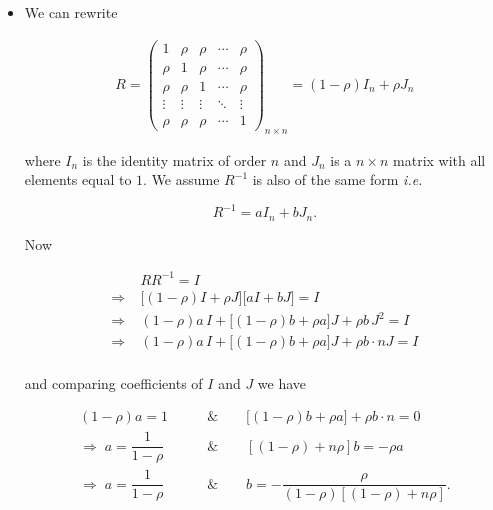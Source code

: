 \documentclass[11pt, a4paper]{article}
\begin{document}
\begin{itemize}

\item[\scalebox{2.0}{\twemoji{keycap: 1}}] \hspace{0.2cm} We can rewrite

\begin{align*}
R = \begin{pmatrix}
1 & \rho & \rho & \cdots & \rho \\
\rho & 1 & \rho & \cdots & \rho \\
\rho & \rho & 1 & \cdots & \rho \\
\vdots & \vdots & \vdots & \ddots & \vdots \\
\rho & \rho & \rho & \cdots & 1
\end{pmatrix}_{n \times n}
= (1 - \rho) I_n + \rho J_n
\end{align*}

where $I_n$ is the identity matrix of order $n$ and $J_n$ is a $n \times n$ matrix with all elements equal to $1$. We assume $R^{-1}$ is also of the same form \textit{i.e.}

\begin{equation}\label{R_inverse_assumption}
R^{-1} = aI_n + bJ_n.
\end{equation}

Now

\begin{align*}
&RR^{-1} = I \\[0.5em]
\Rightarrow\; &\big[(1-\rho)I + \rho J\big]\big[aI + bJ\big] = I \\[0.2em]
\Rightarrow\; &(1-\rho)a\,I + \big[(1-\rho)b + \rho a\big]J + \rho b\,J^2 = I \\[0.2em]
\Rightarrow\; &(1-\rho)a\,I + \big[(1-\rho)b + \rho a\big]J + \rho b \cdot nJ = I \\[0.2em]
\end{align*}

and comparing coefficients of $I$ and $J$ we have

\begin{align*}
(1 - \rho)a = 1 \qquad &\& \qquad \big[(1-\rho)b + \rho a\big] + \rho b \cdot n = 0 \\[0.5em]
\Rightarrow\; a = \dfrac{1}{1 - \rho} \qquad &\&  \qquad \left[ (1 - \rho) + n\rho \right] b = - \rho a \\[0.5em]
\Rightarrow\; a = \dfrac{1}{1 - \rho} \qquad &\&  \qquad b = - \dfrac{\rho}{(1 - \rho) \left[(1 - \rho) + n\rho\right]}.
\end{align*}


\end{itemize}
\end{document}
